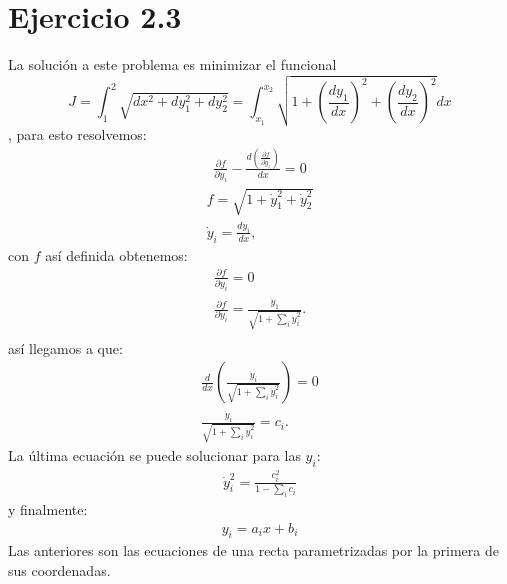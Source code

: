 \documentclass[letterpaper,10pt]{article}
\begin{document}
\section*{Ejercicio 2.3 }
La soluci\'on a este problema es minimizar el funcional $$J=\int_1^2 \sqrt{dx^2+dy_1^2+dy_2^2}=\int_{x_1}^{x_2} \sqrt{1+\left(\frac{dy_1}{dx}\right)^2+\left(\frac{dy_2}{dx}\right)^2}dx$$, para esto resolvemos:
\begin{eqnarray}
\label{eu}
\frac{\partial f}{\partial y_i}-\frac{d\left(\frac{\partial f}{\partial \dot y_i}\right)}{dx}=0
\end{eqnarray}
\begin{eqnarray}
f=\sqrt{1+\dot y_1^2+\dot y_2^2}\\
\dot y_i=\frac{dy_i}{dx},
\end{eqnarray}
con $f$ as\'i definida obtenemos:
\begin{eqnarray}
 \frac{\partial f}{\partial y_i}=0\\
\frac{\partial f}{\partial \dot y_i}=\frac{\dot y_1}{\sqrt{1+\sum_i\dot y_i^2}}.\\
\end{eqnarray}
as\'i llegamos a que:
\begin{eqnarray}
\frac{d}{dx}\left(\frac{\dot y_i}{\sqrt{1+\sum_i\dot y_i^2}}\right)=0\\
\frac{\dot y_i}{\sqrt{1+\sum_i\dot y_i^2}}=c_i.
\end{eqnarray}
La \'ultima ecuaci\'on se puede solucionar para las $y_i$:
\begin{eqnarray}
\dot y_i^2= \frac{c_i^2}{1-\sum_i c_i}
\end{eqnarray}
y finalmente:
\begin{eqnarray}
y_i=a_i x +b_i
\end{eqnarray}
Las anteriores son las ecuaciones de una recta parametrizadas por la primera de sus coordenadas.
\end{document}
